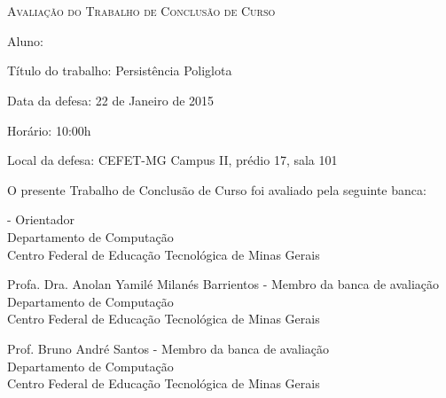 %
%

\makeatletter
\begin{folhadeaprovacao}

	\begin{center}
		\normalfont\scshape{\imprimirinstituicao}\\
		\normalfont\scshape{\imprimirprograma}\\
		Avaliação do Trabalho de Conclusão de Curso
	\end{center}

	\vspace*{50pt}

    Aluno: \imprimirautor

    Título do trabalho: Persistência Poliglota

    Data da defesa: 22 de Janeiro de 2015

    Horário: 10:00h

    Local da defesa: CEFET-MG Campus II, prédio 17, sala 101

    \vspace*{70pt}

    \begin{center}
        O presente Trabalho de Conclusão de Curso foi avaliado pela seguinte banca:
    \end{center}

    \vspace*{70pt}

    \begin{center}
        \imprimirorientador  - Orientador \\
        Departamento de Computação\\
        Centro Federal de Educação Tecnológica de Minas Gerais
        \vspace*{15pt}

        Profa. Dra. Anolan Yamilé Milanés Barrientos - Membro da banca de avaliação\\
        Departamento de Computação\\
        Centro Federal de Educação Tecnológica de Minas Gerais
        \vspace*{15pt}

        Prof. Bruno André Santos - Membro da banca de avaliação\\
        Departamento de Computação\\
        Centro Federal de Educação Tecnológica de Minas Gerais
    \end{center}

    \vspace*{\fill}

\end{folhadeaprovacao}
\makeatother
